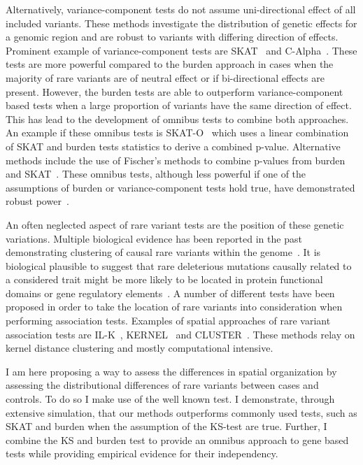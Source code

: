 Alternatively, variance-component tests do not assume uni-directional effect of all included variants. 
These methods investigate the distribution of genetic effects for a genomic region and are robust to variants with differing direction of effects.
Prominent example of variance-component tests are SKAT~\cite{Wu2011} and C-Alpha~\cite{Neale2011}.
These tests are more powerful compared to the burden approach in cases when the majority of rare variants are of neutral effect or if bi-directional effects are present.
However, the burden tests are able to outperform variance-component based tests when a large proportion of variants have the same direction of effect.
This has lead to the development of omnibus tests to combine both approaches.
An example if these omnibus tests is SKAT-O~\cite{Lee2012a} which uses a linear combination of SKAT and burden tests statistics to derive a combined p-value.
Alternative methods include the use of Fischer's methods to combine p-values from burden and SKAT~\cite{Derkach2013a}.
These omnibus tests, although less powerful if one of the assumptions of burden or variance-component tests hold true, have demonstrated robust power~\cite{Lee2014}. 

An often neglected aspect of rare variant tests are the position of these genetic variations.
Multiple biological evidence has been reported in the past demonstrating clustering of causal rare variants within the genome~\cite{Ionita-Laza2012, Raab2010,Schaid2013,Fier2012}.
It is biological plausible to suggest that rare deleterious mutations causally related to a considered trait might be more likely to be located in protein functional domains or gene regulatory elements~\cite{Fier2012}.
A number of different tests have been proposed in order to take the location of rare variants into consideration when performing association tests.
Examples of spatial approaches of rare variant association tests are IL-K~\cite{Ionita-Laza2012}, KERNEL~\cite{Schaid2013} and CLUSTER~\cite{Lin2014}.
These methods relay on kernel distance clustering and mostly computational intensive.

I am here proposing a way to assess the differences in spatial organization by assessing the distributional differences of rare variants between cases and controls.
To do so I make use of the well known  test.
I demonstrate, through extensive simulation, that our methods outperforms commonly used tests, such as SKAT and burden when the assumption of the KS-test are true.
Further, I combine the KS and burden test to provide an omnibus approach to gene based tests while providing empirical evidence for their independency.

